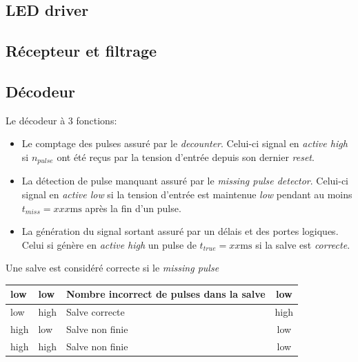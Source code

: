 \documentclass[french]{layout/Report}
\begin{document}

\subsection{LED driver}

\subsection{Récepteur et filtrage}

\subsection{Décodeur}
Le décodeur à 3 fonctions:
\begin{itemize}
    \item{Le comptage des pulses assuré par le \emph{decounter}. Celui-ci signal en \emph{active high} si $n_{pulse}$ ont été reçus par la tension d'entrée depuis son dernier \emph{reset}.}
    \item{La détection de pulse manquant assuré par le \emph{missing pulse detector}. Celui-ci signal en \emph{active low} si la tension d'entrée est maintenue \emph{low} pendant au moins $t_{miss} = xxx \si{\milli\second}$ après la fin d'un pulse.}
    \item{La génération du signal sortant assuré par un délais et des portes logiques. Celui si génère en \emph{active high} un pulse de $t_{true} = xx\si{\milli\second}$ si la salve est \emph{correcte}.}
\end{itemize}

Une salve est considéré correcte si le \emph{missing pulse }
\begin{center}
    \begin{tabular}{| m{4cm} | m{4cm} | l | c |}
        \hline
        low     & low       & Nombre incorrect de pulses dans la salve & low \\ \hline
        low     & high  & Salve correcte    & high\\ \hline
        high    & low       & Salve non finie & low \\ \hline
        high    & high  & Salve non finie & low \\ \hline
    \end{tabular}
\end{center}
\end{document}
